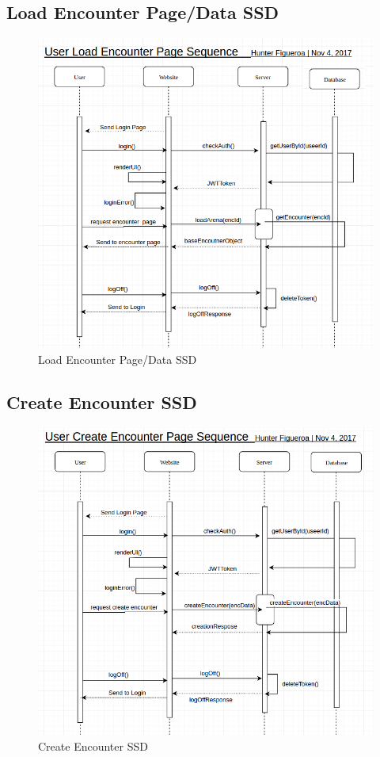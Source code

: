 \documentclass[12pt,a4paper]{report}
\begin{document}
	\newpage
	\subsection {Load Encounter Page/Data SSD}
	\begin{figure}[H]
		\centering
		\centerline{\includegraphics[scale=.7, angle=90]{ssd_encounter_page}}
		\caption{Load Encounter Page/Data SSD}
		\label{fig: Load Encounter Page/Data SSD }
	\end{figure}

	\newpage
	\subsection {Create Encounter SSD}
	\begin{figure}[H]
		\centering
		\centerline{\includegraphics[scale=.7, angle=90]{ssd_create_enc}}
		\caption{Create Encounter SSD}
		\label{fig: Create Encounter SSD }
	\end{figure}
\end{document}

